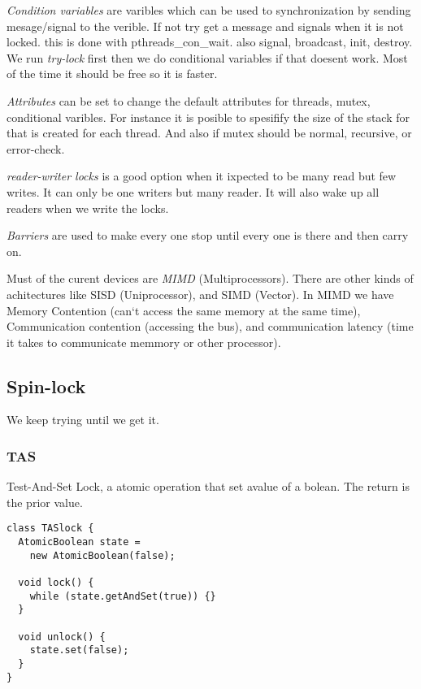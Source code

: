\textit{Condition variables} are varibles which can be used to synchronization by
sending mesage/signal to the verible. If not try get a message and signals when it is not locked.
this is done with pthreads\_con\_wait. also signal, broadcast, init, destroy.
We run \textit{try-lock} first then we do conditional variables if that doesent work.
Most of the time it should be free so it is faster.

\textit{Attributes} can be set to change the default attributes for threads, mutex, conditional varibles.
For instance it is posible to spesifify the size of the stack for that is created for each thread.
And also if mutex should be normal, recursive, or error-check.

\textit{reader-writer locks} is a good option when it ixpected to be many read but few writes.
It can only be one writers but many reader. It will also wake up all readers when we write the locks.

\textit{Barriers} are used to make every one stop until every one is there and then carry on.


Must of the curent devices are \textit{MIMD} (Multiprocessors). There are other kinds of achitectures
like SISD (Uniprocessor), and SIMD (Vector). In MIMD we have Memory Contention
(can`t access the same memory at the same time), Communication contention (accessing the bus),
and communication latency (time it takes to communicate memmory or other processor).

\subsection{Spin-lock}
We keep trying until we get it.

\subsubsection{TAS}
Test-And-Set Lock, a atomic operation that set avalue of a bolean. The return is the prior value.

\begin{BVerbatim}[baseline=c]
class TASlock {
  AtomicBoolean state =
    new AtomicBoolean(false);

  void lock() {
    while (state.getAndSet(true)) {}
  }
  
  void unlock() {
    state.set(false);
  }
}
\end{BVerbatim}

